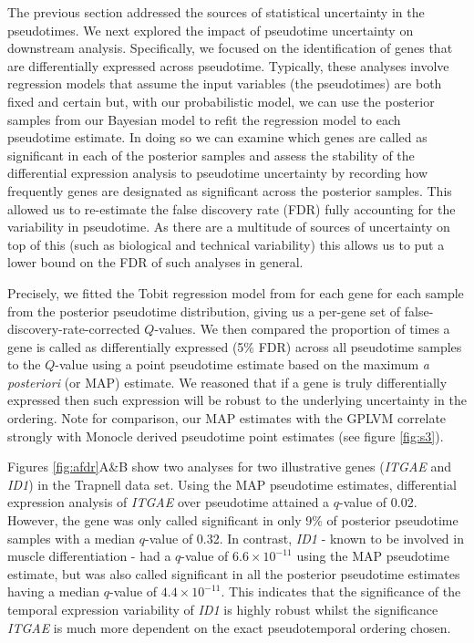 The previous section addressed the sources of statistical uncertainty in the pseudotimes. We next explored the impact of pseudotime uncertainty on downstream analysis. Specifically, we focused on the identification of genes that are differentially expressed across pseudotime. Typically, these analyses involve regression models that assume the input variables (the pseudotimes) are both fixed and certain but, with our probabilistic model, we can use the posterior samples from our Bayesian model to refit the regression model to each pseudotime estimate. In doing so we can examine which genes are called as significant in each of the posterior samples and assess the stability of the differential expression analysis to pseudotime uncertainty by recording how frequently genes are designated as significant across the posterior samples. This allowed us to re-estimate the false discovery rate (FDR)  fully accounting for the variability in pseudotime. As there are a multitude of sources of uncertainty on top of this (such as biological and technical variability) this allows us to put a lower bound on the FDR of such analyses in general.

Precisely, we fitted the Tobit regression model from \cite{Trapnell2014-xi} for each gene for each sample from the posterior pseudotime distribution, giving us a per-gene set of false-discovery-rate-corrected $Q$-values. We then compared the proportion of times a gene is called as differentially expressed (5\% FDR) across all pseudotime samples to the $Q$-value using a point pseudotime estimate based on the maximum \textit{a posteriori} (or MAP) estimate. We reasoned that if a gene is truly differentially expressed then such expression will be robust to the underlying uncertainty in the ordering. Note for comparison, our MAP estimates with the GPLVM correlate strongly with Monocle derived pseudotime point estimates (see figure \ref{fig:s3}).

Figures \ref{fig:afdr}A\&B show two analyses for two illustrative genes  (\emph{ITGAE} and \emph{ID1}) in the Trapnell data set. Using the MAP pseudotime estimates, differential expression analysis of \emph{ITGAE} over pseudotime attained a $q$-value of 0.02. However, the gene was only called significant in only 9\% of posterior pseudotime samples with a median $q$-value of 0.32. In contrast, \emph{ID1} - known to be involved in muscle differentiation - had a $q$-value of $6.6 \times 10^{-11}$ using the MAP pseudotime estimate, but was also called  significant in all the posterior pseudotime estimates having a median $q$-value of $4.4 \times 10^{-11}$. This indicates that the significance of the temporal expression variability of \emph{ID1} is highly robust whilst the significance \emph{ITGAE} is much more dependent on the exact pseudotemporal ordering chosen.

